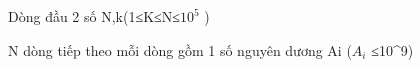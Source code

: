 Dòng đầu 2 số N,k(1≤K≤N≤$10^{5}$   )  

   N dòng tiếp theo mỗi dòng gồm 1 số nguyên dương Ai ($A_{i}$   ≤10^9)